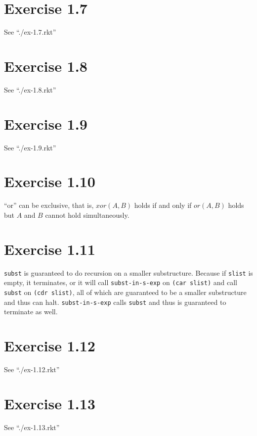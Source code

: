 \documentclass[11pt,a4paper]{article}
\begin{document}
\section{Exercise 1.7}

See ``./ex-1.7.rkt''

\section{Exercise 1.8}

See ``./ex-1.8.rkt''

\section{Exercise 1.9}

See ``./ex-1.9.rkt''

\section{Exercise 1.10}

``or'' can be exclusive, that is, $xor(A,B)$ holds if and only if
$or(A,B)$ holds but $A$ and $B$ cannot hold simultaneously. 

\section{Exercise 1.11}

\texttt{subst} is guaranteed to do recursion on a smaller substructure.
Because if \texttt{slist} is empty, it terminates, or it will call
\texttt{subst-in-s-exp} on \texttt{(car slist)} and call
\texttt{subst} on \texttt{(cdr slist)}, all of which are guaranteed to
be a smaller substructure and thus can halt.
\texttt{subst-in-s-exp} calls \texttt{subst} and thus is guaranteed to
terminate as well.

\section{Exercise 1.12}

See ``./ex-1.12.rkt''

\section{Exercise 1.13}

See ``./ex-1.13.rkt''
\end{document}
